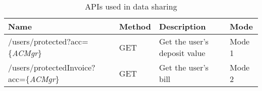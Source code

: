 \begin{table}[h]
    \centering
    \caption[APIs used in data sharing]{APIs used in data sharing}
    \label{table:api}
    \begin{tabular}{llll}
    \toprule[1.1pt]
                  Name & Method & Description & Mode\\
    \midrule[1.1pt]
    \multirow{1}{*}{/users/protected?acc=\{\textit{ACMgr}\}} & GET & Get the user's deposit value & Mode 1\\
    \midrule
    \multirow{1}{*}{/users/protectedInvoice?acc=\{\textit{ACMgr}\}} & GET & Get the user's bill & Mode 2\\
    \bottomrule[1.1pt]
    \end{tabular}
    \end{table}